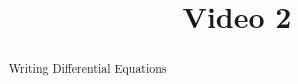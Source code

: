\documentclass[handout]{ximera}
\title{Video 2}
\begin{document}
\begin{abstract}
Writing Differential Equations
\end{abstract}

\maketitle

\end{document}
